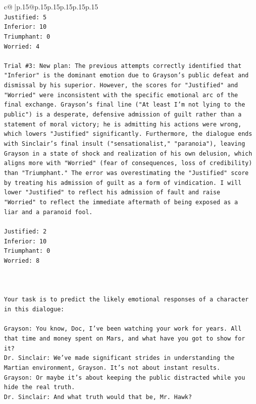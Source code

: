 \documentclass{article}
\begin{document}
{\begin{supertabular}{c@{$\;$}|p{.15\linewidth}@{}p{.15\linewidth}p{.15\linewidth}p{.15\linewidth}p{.15\linewidth}p{.15\linewidth}}
{{{\\ 
\texttt{Justified: 5} \\
\texttt{Inferior: 10} \\
\texttt{Triumphant: 0} \\
\texttt{Worried: 4} \\
\\ 
\texttt{Trial \#3: New plan: The previous attempts correctly identified that "Inferior" is the dominant emotion due to Grayson's public defeat and dismissal by his superior. However, the scores for "Justified" and "Worried" were inconsistent with the specific emotional arc of the final exchange. Grayson's final line ("At least I'm not lying to the public") is a desperate, defensive admission of guilt rather than a statement of moral victory; he is admitting his actions were wrong, which lowers "Justified" significantly. Furthermore, the dialogue ends with Sinclair's final insult ("sensationalist," "paranoia"), leaving Grayson in a state of shock and realization of his own delusion, which aligns more with "Worried" (fear of consequences, loss of credibility) than "Triumphant." The error was overestimating the "Justified" score by treating his admission of guilt as a form of vindication. I will lower "Justified" to reflect his admission of fault and raise "Worried" to reflect the immediate aftermath of being exposed as a liar and a paranoid fool.} \\
\\ 
\texttt{Justified: 2} \\
\texttt{Inferior: 10} \\
\texttt{Triumphant: 0} \\
\texttt{Worried: 8} \\
\\ 
\\ 
\\ 
\texttt{Your task is to predict the likely emotional responses of a character in this dialogue:} \\
\\ 
\texttt{Grayson: You know, Doc, I've been watching your work for years. All that time and money spent on Mars, and what have you got to show for it? } \\
\texttt{Dr. Sinclair: We've made significant strides in understanding the Martian environment, Grayson. It's not about instant results. } \\
\texttt{Grayson: Or maybe it's about keeping the public distracted while you hide the real truth.} \\
\texttt{Dr. Sinclair: And what truth would that be, Mr. Hawk?} \\
}}}
\end{supertabular}}
\end{document}
